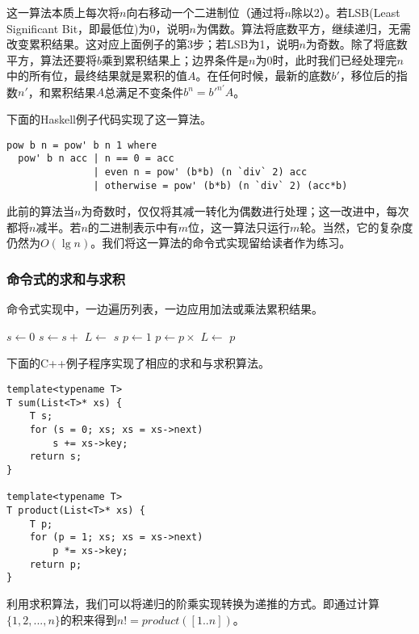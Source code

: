 \documentclass[b5paper]{ctexart}
\begin{document}
这一算法本质上每次将$n$向右移动一个二进制位（通过将$n$除以2）。若LSB(Least Significant Bit，即最低位)为0，说明$n$为偶数。算法将底数平方，继续递归，无需改变累积结果。这对应上面例子的第3步；若LSB为1，说明$n$为奇数。除了将底数平方，算法还要将$b$乘到累积结果上；边界条件是$n$为0时，此时我们已经处理完$n$中的所有位，最终结果就是累积的值$A$。在任何时候，最新的底数$b'$，移位后的指数$n'$，和累积结果$A$总满足不变条件$b^n = b'^{n'}A$。

下面的Haskell例子代码实现了这一算法。

\lstset{language=Haskell}
\begin{lstlisting}[style=Haskell]
pow b n = pow' b n 1 where
  pow' b n acc | n == 0 = acc
               | even n = pow' (b*b) (n `div` 2) acc
               | otherwise = pow' (b*b) (n `div` 2) (acc*b)
\end{lstlisting}

此前的算法当$n$为奇数时，仅仅将其减一转化为偶数进行处理；这一改进中，每次都将$n$减半。若$n$的二进制表示中有$m$位，这一算法只运行$m$轮。当然，它的复杂度仍然为$O(\lg n)$。我们将这一算法的命令式实现留给读者作为练习。

\subsubsection{命令式的求和与求积}
命令式实现中，一边遍历列表，一边应用加法或乘法累积结果。

\begin{algorithmic}[1]
  \State $s \gets 0$
    \State $s \gets s +$ 
    \State $L \gets$ 
  \EndWhile
  \State \Return $s$
\EndFunction
\Statex
{}
  \State $p \gets 1$
    \State $p \gets p \times $ 
    \State $L \gets$ 
  \EndWhile
  \State \Return $p$
\EndFunction
\end{algorithmic}

下面的C++例子程序实现了相应的求和与求积算法。

\lstset{language=C++}
\begin{lstlisting}
template<typename T>
T sum(List<T>* xs) {
    T s;
    for (s = 0; xs; xs = xs->next)
        s += xs->key;
    return s;
}

template<typename T>
T product(List<T>* xs) {
    T p;
    for (p = 1; xs; xs = xs->next)
        p *= xs->key;
    return p;
}
\end{lstlisting}

利用求积算法，我们可以将递归的阶乘实现转换为递推的方式。即通过计算$\{1, 2, ..., n\}$的积来得到$n! = product([1..n])$。
\end{document}
